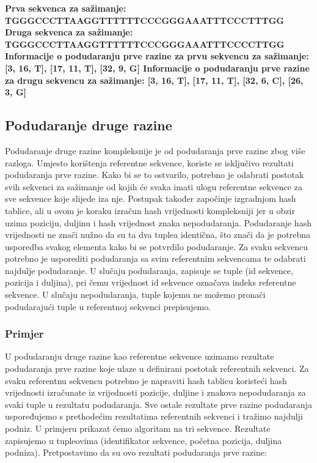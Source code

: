\begin{minipage}{10cm}
	\textbf{
		 Prva sekvenca za sažimanje:\newline
		TGGGCCCTTAAGGTTTTTTCCCGGGAAATTTCCCTTTGG\newline
		Druga sekvenca za sažimanje:\newline
TGGGCCCTTAAGGTTTTTTCCCGGGAAATTTCCCCTTGG\newline
		}		
	\textbf{Informacije o podudaranju prve razine za prvu sekvencu za sažimanje:\newline
		 {[3, 16, T], [17, 11, T], [32, 9, G]}				\newline
		Informacije o podudaranju prve razine za drugu sekvencu za sažimanje: \newline 
		{[3, 16, T], [17, 11, T], [32, 6, C], [26, 3, G]}
		\newline
		}
\end{minipage}

\subsection{Podudaranje druge razine}
Podudaranje druge razine kompleksnije je od podudaranja prve razine zbog više razloga. Umjesto korištenja referentne sekvence, koriste se isključivo rezultati podudaranja prve razine. Kako bi se to ostvarilo, potrebno je odabrati postotak svih sekvenci za sažimanje od kojih će svaka imati ulogu referentne sekvence za sve sekvence koje slijede iza nje.
Postupak također započinje izgradnjom hash tablice, ali u ovom je koraku izračun hash vrijednosti kompleksniji jer u obzir uzima poziciju, duljinu i hash vrijednost znaka nepodudaranja. Podudaranje hash vrijednosti ne znači nužno da su ta dva tuplea identična, što znači da je potrebna usporedba svakog elementa kako bi se potvrdilo podudaranje. Za svaku sekvencu potrebno je usporediti podudaranja sa svim referentnim sekvencama te odabrati najdulje podudaranje. U slučaju podudaranja, zapisuje se tuple (id sekvence, pozicija i duljina), pri čemu vrijednost id sekvence označava indeks referentne sekvence. U slučaju nepodudaranja, tuple kojemu ne možemo pronaći podudarajući tuple u referentnoj sekvenci prepisujemo.

\subsubsection{Primjer}
U podudaranju druge razine kao referentne sekvence uzimamo rezultate podudaranja prve razine koje ulaze u definirani postotak referentnih sekvenci. Za svaku referentnu sekvencu potrebno je napraviti hash tablicu koristeći hash vrijednosti izračunate iz vrijednosti pozicije, duljine i znakova nepodudaranja za svaki tuple u rezultatu podudaranja. Sve ostale rezultate prve razine podudaranja uspoređujemo s prethodećim rezultatima referentnih sekvenci i tražimo najdulji podniz. U primjeru prikazat ćemo algoritam na tri sekvence. Rezultate zapisujemo u tupleovima (identifikator sekvence, početna pozicija, duljina podniza). Pretpostavimo da su ovo rezultati podudaranja prve razine:\newline

